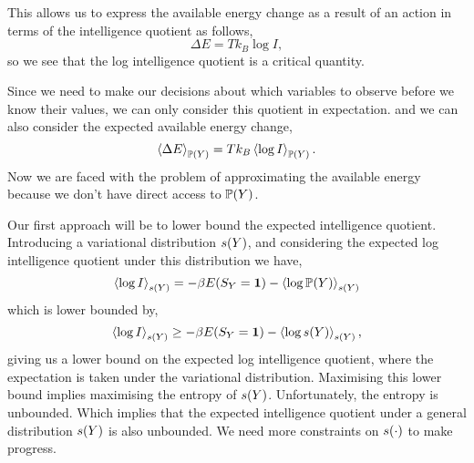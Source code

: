 \documentclass[]{article}
\begin{document}
This allows us to express the available energy change as a result of
an action in terms of the intelligence quotient as follows,
\[
\Delta E = T k_B\log I,
\]
so we see that the log intelligence quotient is a critical quantity. 

Since we need to make our decisions about which variables to observe
before we know their values, we can only consider this quotient in
expectation.  and we can also consider the expected available energy
change,
\[
\left\langle \Delta E \right\rangle_{\mathbb{P}(Y)} = T k_B\left\langle \log I \right\rangle_{\mathbb{P}(Y)}.
\]
Now we are faced with the problem of approximating the available
energy because we don't have direct access to
$\mathbb{P}(Y)$.

Our first approach will be to lower bound the expected intelligence
quotient. Introducing a variational distribution
$s(Y)$, and considering the expected log
intelligence quotient under this distribution we have,
\[
\left\langle \log I \right\rangle_{s(Y)}   = - \beta E(S_Y=\textbf{1}) - \left\langle \log \mathbb{P}(Y) \right\rangle_{s(Y)}
\]
which is lower bounded by,
\begin{equation}
  \left\langle \log I \right\rangle_{s(Y)} \geq - \beta
  E(S_Y=\textbf{1}) - \left\langle \log
    s(Y) \right\rangle_{s(Y)}, \label{eqn-lir-lower}
\end{equation}
giving us a lower bound on the expected log intelligence quotient,
where the expectation is taken under the variational
distribution. Maximising this lower bound implies maximising the
entropy of $s(Y)$. Unfortunately, the entropy is
unbounded. Which implies that the expected intelligence quotient under
a general distribution $s(Y)$ is also
unbounded. We need more constraints on $s(\cdot)$ to make
progress.
\end{document}
